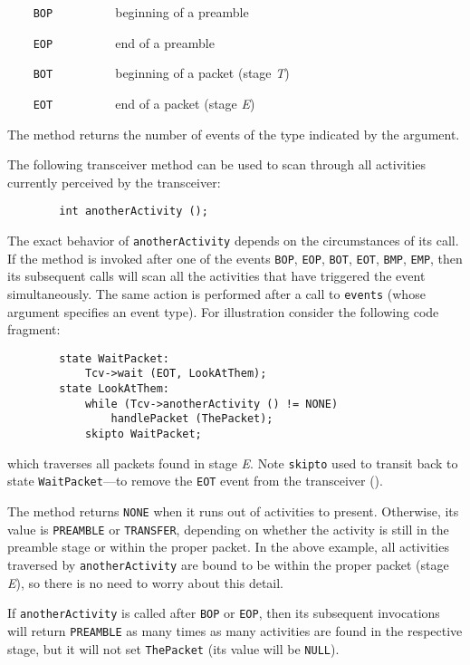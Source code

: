 \noindent
{\tt ~~~~BOP~~~~~~~~~} beginning of a preamble

\noindent
{\tt ~~~~EOP~~~~~~~~~} end of a preamble

\noindent
{\tt ~~~~BOT~~~~~~~~~} beginning of a packet (stage {\em T\/})

\noindent
{\tt ~~~~EOT~~~~~~~~~} end of a packet (stage {\em E\/})

\bigskip

\noindent
The method returns the number of events of the type indicated by the
argument.

The following transceiver method can be used to scan through all activities
currently perceived by the transceiver:
\begin{verbatim}
        int anotherActivity ();
\end{verbatim}
\noindent
The exact behavior of {\tt anotherActivity} depends on the circumstances of
its call.
If the method is invoked after one of the events {\tt BOP}, {\tt EOP},
{\tt BOT}, {\tt EOT}, {\tt BMP}, {\tt EMP},
then its subsequent calls will scan all the activities that have
triggered the event simultaneously.
The same action is performed after a call to {\tt events} (whose argument
specifies an event type).
For illustration consider the following code fragment:
\begin{verbatim}
        state WaitPacket:
            Tcv->wait (EOT, LookAtThem);
        state LookAtThem:
            while (Tcv->anotherActivity () != NONE)
                handlePacket (ThePacket);
            skipto WaitPacket;
\end{verbatim}
\noindent
which traverses all packets found in stage {\em E}.
Note {\tt skipto} used to transit back to state {\tt WaitPacket}---to 
remove the {\tt EOT} event from the transceiver ().

The method returns {\tt NONE} when it runs out of activities to present.
Otherwise, its value is
{\tt PREAMBLE} or {\tt TRANSFER}, depending on whether the activity is still
in the preamble stage or within the proper packet.
In the above example, all activities traversed by {\tt anotherActivity} are
bound to be within the proper packet (stage {\em E\/}), so there is no
need to worry about this detail.

If {\tt anotherActivity} is called after {\tt BOP} or {\tt EOP},
then its subsequent invocations
will return {\tt PREAMBLE} as many times as many activities are found in the
respective stage, but it will not set {\tt ThePacket} (its value will be
{\tt NULL}).

